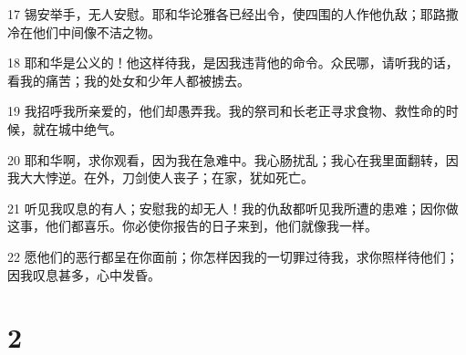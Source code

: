 \par 17 锡安举手，无人安慰。耶和华论雅各已经出令，使四围的人作他仇敌；耶路撒冷在他们中间像不洁之物。
\par 18 耶和华是公义的！他这样待我，是因我违背他的命令。众民哪，请听我的话，看我的痛苦；我的处女和少年人都被掳去。
\par 19 我招呼我所亲爱的，他们却愚弄我。我的祭司和长老正寻求食物、救性命的时候，就在城中绝气。
\par 20 耶和华啊，求你观看，因为我在急难中。我心肠扰乱；我心在我里面翻转，因我大大悖逆。在外，刀剑使人丧子；在家，犹如死亡。
\par 21 听见我叹息的有人；安慰我的却无人！我的仇敌都听见我所遭的患难；因你做这事，他们都喜乐。你必使你报告的日子来到，他们就像我一样。
\par 22 愿他们的恶行都呈在你面前；你怎样因我的一切罪过待我，求你照样待他们；因我叹息甚多，心中发昏。

\chapter{2}

